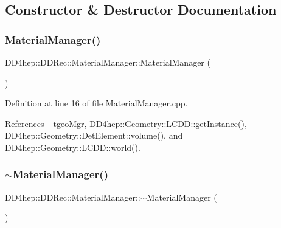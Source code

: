 \subsection{Constructor \& Destructor Documentation}
\hypertarget{class_d_d4hep_1_1_d_d_rec_1_1_material_manager_a7f32a7b551449b6143f56ba4a3f90c18}{}\label{class_d_d4hep_1_1_d_d_rec_1_1_material_manager_a7f32a7b551449b6143f56ba4a3f90c18} 
\subsubsection{\texorpdfstring{Material\+Manager()}{MaterialManager()}}
{\footnotesize\ttfamily D\+D4hep\+::\+D\+D\+Rec\+::\+Material\+Manager\+::\+Material\+Manager (\begin{DoxyParamCaption}{ }\end{DoxyParamCaption})}



Definition at line 16 of file Material\+Manager.\+cpp.



References \+\_\+tgeo\+Mgr, D\+D4hep\+::\+Geometry\+::\+L\+C\+D\+D\+::get\+Instance(), D\+D4hep\+::\+Geometry\+::\+Det\+Element\+::volume(), and D\+D4hep\+::\+Geometry\+::\+L\+C\+D\+D\+::world().

\hypertarget{class_d_d4hep_1_1_d_d_rec_1_1_material_manager_a0251231cf063ba1b449c858b4b3a00a6}{}\label{class_d_d4hep_1_1_d_d_rec_1_1_material_manager_a0251231cf063ba1b449c858b4b3a00a6} 
\subsubsection{\texorpdfstring{$\sim$\+Material\+Manager()}{~MaterialManager()}}
{\footnotesize\ttfamily D\+D4hep\+::\+D\+D\+Rec\+::\+Material\+Manager\+::$\sim$\+Material\+Manager (\begin{DoxyParamCaption}{ }\end{DoxyParamCaption})}



